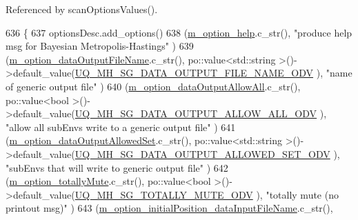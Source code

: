 Referenced by scan\-Options\-Values().


\begin{DoxyCode}
636 \{
637   optionsDesc.add\_options()     
638     (\hyperlink{class_q_u_e_s_o_1_1_metropolis_hastings_s_g_options_af73e79036b108974843e26bc036c70ce}{m\_option\_help}.c\_str(),                                                                   
                                                                                   \textcolor{stringliteral}{"produce help msg for Bayesian
       Metropolis-Hastings"}          )
639     (\hyperlink{class_q_u_e_s_o_1_1_metropolis_hastings_s_g_options_ae5efdb40f8282073ebcad5892af4be44}{m\_option\_dataOutputFileName}.c\_str(),                         
      po::value<std::string >()->default\_value(\hyperlink{_metropolis_hastings_s_g_options_8h_a429b42cebbd00d174ed2efac802abaf1}{UQ\_MH\_SG\_DATA\_OUTPUT\_FILE\_NAME\_ODV}             
                    ), \textcolor{stringliteral}{"name of generic output file"}                                )
640     (\hyperlink{class_q_u_e_s_o_1_1_metropolis_hastings_s_g_options_a6d1f0f09fa5e238a54c6269c48fc6b29}{m\_option\_dataOutputAllowAll}.c\_str(),                         po::value<bool
              >()->default\_value(\hyperlink{_metropolis_hastings_s_g_options_8h_acbcb85de420cccf7be4cef22854687aa}{UQ\_MH\_SG\_DATA\_OUTPUT\_ALLOW\_ALL\_ODV}             
                    ), \textcolor{stringliteral}{"allow all subEnvs write to a generic output file"}           )
641     (\hyperlink{class_q_u_e_s_o_1_1_metropolis_hastings_s_g_options_a7d12ea603c8aba9215ad462d51720204}{m\_option\_dataOutputAllowedSet}.c\_str(),                       
      po::value<std::string >()->default\_value(\hyperlink{_metropolis_hastings_s_g_options_8h_aa78c5ee907c264c2df072765e04f437b}{UQ\_MH\_SG\_DATA\_OUTPUT\_ALLOWED\_SET\_ODV}       
                        ), \textcolor{stringliteral}{"subEnvs that will write to generic output file"}             )
642     (\hyperlink{class_q_u_e_s_o_1_1_metropolis_hastings_s_g_options_adc30bd8388e2da2b063671fc5ccad850}{m\_option\_totallyMute}.c\_str(),                                po::value<bool       
       >()->default\_value(\hyperlink{_metropolis_hastings_s_g_options_8h_acb9f240640622a2d5960ac52187000fc}{UQ\_MH\_SG\_TOTALLY\_MUTE\_ODV}                                    ),
       \textcolor{stringliteral}{"totally mute (no printout msg)"}                             )
643     (\hyperlink{class_q_u_e_s_o_1_1_metropolis_hastings_s_g_options_a2dbb00eec372f529d21f770b0f220bd9}{m\_option\_initialPosition\_dataInputFileName}.c\_str(),         

\end{DoxyCode}
